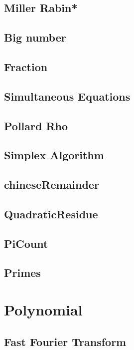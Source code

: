 \subsection{Miller Rabin*} %

\subsection{Big number}

\subsection{Fraction}

\subsection{Simultaneous Equations}

\subsection{Pollard Rho}

\subsection{Simplex Algorithm}

\subsection{chineseRemainder}

\subsection{QuadraticResidue}

\subsection{PiCount}

\subsection{Primes}



\section{Polynomial}
\subsection{Fast Fourier Transform}


